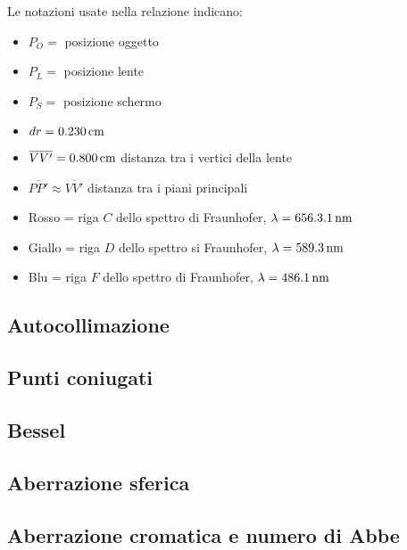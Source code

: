 Le notazioni usate nella relazione indicano:
\begin{itemize}
\item $P_O =$ posizione oggetto
\item $P_L =$ posizione lente
\item $P_S =$ posizione schermo
\item $dr = 0.230 \,\mathrm{cm}$ %
\item $\overline{VV'} = 0.800 \,\mathrm{cm}$ distanza tra i vertici della lente
\item $\overline{PP'} \approx \overline{VV'}$ distanza tra i piani principali
\item Rosso = riga $C$ dello spettro di Fraunhofer, $\lambda = 656.3.1 \,\mathrm{nm}$
\item Giallo = riga $D$ dello spettro si Fraunhofer, $\lambda = 589.3 \,\mathrm{nm}$
\item Blu = riga $F$ dello spettro di Fraunhofer, $\lambda = 486.1 \,\mathrm{nm}$
\end{itemize}
\FloatBarrier
\subsection{Autocollimazione}
\label{subsec:autocollimazione}

\FloatBarrier
\subsection{Punti coniugati}

\FloatBarrier
\subsection{Bessel}

\FloatBarrier
\subsection{Aberrazione sferica}
\label{subsec:aberrazione_sferica}

\FloatBarrier
\subsection{Aberrazione cromatica e numero di Abbe}

